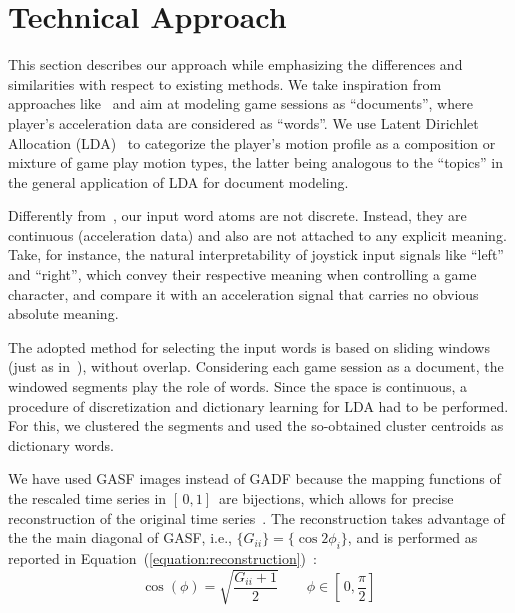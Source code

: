 \section{Technical Approach}
This section describes our approach while emphasizing the differences and similarities with respect to existing methods. We take inspiration from approaches like~\cite{smith_mining_2016, wang_encoding_2015, wang_imaging_2015} and aim at modeling game sessions as ``documents'', where player's acceleration data are considered as ``words''. We use Latent Dirichlet Allocation (LDA)~\cite{blei_latent_2003} to categorize the player's motion profile as a composition or mixture of game play motion types, the latter being analogous to the ``topics'' in the general application of LDA for document modeling.

Differently from~\cite{smith_mining_2016}, our input word atoms are not discrete. Instead, they are continuous (acceleration data) and also are not attached to any explicit meaning. Take, for instance, the natural interpretability of joystick input signals like ``left'' and ``right'', which convey their respective meaning when controlling a game character, and compare it with an acceleration signal that carries no obvious absolute meaning.

The adopted method for selecting the input words is based on sliding windows (just as in~\cite{smith_mining_2016}), without overlap. Considering each game session as a document, the windowed segments play the role of words. Since the space is continuous, a procedure of discretization and dictionary learning for LDA had to be performed. For this, we clustered the segments and used the so-obtained cluster centroids as dictionary words.

We have used GASF images instead of GADF because the mapping functions of the rescaled time series in $[\,0,1]\,$ are bijections, which allows for precise reconstruction of the original time series~\cite{wang_imaging_2015}. The reconstruction takes advantage of the the main diagonal of GASF, i.e., $\{G_{ii}\} = \{\cos{2\phi_{i}}\}$, and is performed as reported in Equation~(\ref{equation:reconstruction})~\cite{wang_imaging_2015}: 
\begin{equation}\label{equation:reconstruction}
\cos(\phi)=\sqrt{\frac{G_{ii}+1}{2}} \qquad \phi \in [\,0,\frac{\pi}{2}]\,
\end{equation}

